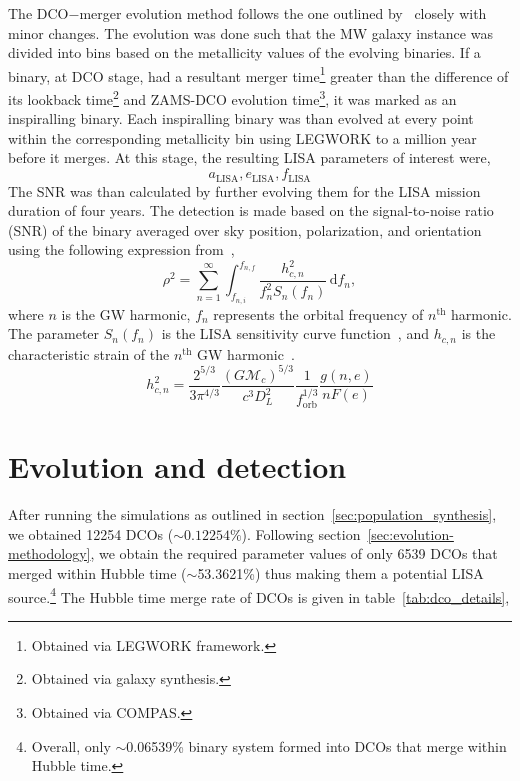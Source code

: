 \documentclass[twocolumn, twocolappendix]{aastex63}
\newcommand{\semaxis}[1]{a_{\text{#1}}}
\newcommand{\ecc}[1]{e_\text{#1}}
\begin{document}
The DCO$-$merger evolution method follows the one outlined by~\cite{Wagg2021} closely with minor changes.
The evolution was done such that the MW galaxy instance was divided into bins based on the metallicity values of the evolving binaries.
If a binary, at DCO stage, had a resultant merger time\footnote{Obtained via LEGWORK framework.} greater than the difference of its lookback time\footnote{Obtained via galaxy synthesis.} and ZAMS-DCO evolution time\footnote{Obtained via COMPAS.}, it was marked as an inspiralling binary.
Each inspiralling binary was than evolved at every point within the corresponding metallicity bin using LEGWORK to a million year before it merges.
At this stage, the resulting LISA parameters of interest were,
\begin{equation}%
\semaxis{LISA}, \ecc{LISA}, f_{\text{LISA}}
\label{eq:lisa_parameter_names}
\end{equation}%
The SNR was than calculated by further evolving them for the LISA mission duration of four years.
The detection is made based on the signal-to-noise ratio (SNR) of the binary averaged over sky position, polarization, and orientation using the following expression from~\citep{Finn2000},
\begin{equation}
\rho^2 = \sum_{n=1}^{\infty}\int_{f_{n, i}}^{f_{n, f}}\frac{h_{c, n}^2}{f_n^2 S_n(f_n)}\,\text{d}f_n,
\label{eq:snr_equation}
\end{equation}
where $n$ is the GW harmonic, $f_n$ represents the orbital frequency of $n^\text{th}$ harmonic.
The parameter $S_n(f_n)$ is the LISA sensitivity curve function~\citep{Robson2019}, and $h_{c, n}$ is the characteristic strain of the $n^\text{th}$ GW harmonic~\citep{Barack2004}.
\begin{equation}
h_{c,n}^2 = \frac{2^{5/3}}{3\pi^{4/3}}\frac{(G\mathcal{M}_c)^{5/3}}{c^3 D_L^2}\frac{1}{f_\text{orb}^{1/3}}\frac{g(n, e)}{nF(e)}
\label{eq:characteristic_strain}
\end{equation}

\section{Evolution and detection}
\label{sec:evolution-and-detection}

After running the simulations as outlined in section~\ref{sec:population_synthesis}, we obtained 12254 DCOs ($\sim0.12254\%$).
Following section~\ref{sec:evolution-methodology}, we obtain the required parameter values of only 6539 DCOs that merged within Hubble time ($\sim$53.3621\%) thus making them a potential LISA source.\footnote{Overall, only $\sim$0.06539\% binary system formed into DCOs that merge within Hubble time.}
The Hubble time merge rate of DCOs is given in table~\ref{tab:dco_details},
\end{document}
